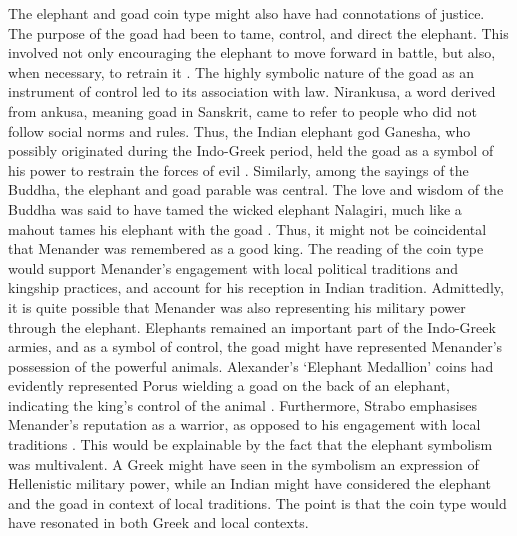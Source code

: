 \documentclass{ijsra}
\begin{document}
The elephant and goad coin type might also have had connotations of justice.
The purpose of the goad had been to tame, control, and direct the elephant. 
This involved not only encouraging the elephant to move forward in battle, but also, when necessary, to retrain it \parencite[66--67]{Trautmann2015}. 
The highly symbolic nature of the goad as an instrument of control led to its association with law. 
Nirankusa, a word derived from ankusa, meaning goad in Sanskrit, came to refer to people who did not follow social norms and rules. 
Thus, the Indian elephant god Ganesha, who possibly originated during the Indo-Greek period, 
held the goad as a symbol of his power to restrain the forces of evil \parencites[96]{Alter2004}[55]{Dhavalikar1991}.
Similarly, among the sayings of the Buddha, the elephant and goad parable was central. 
The love and wisdom of the Buddha was said to have tamed the wicked elephant Nalagiri, 
much like a mahout tames his elephant with the goad \parencite[96]{Dhammika2005}. 
Thus, it might not be coincidental that Menander was remembered as a good king. 
The reading of the coin type would support Menander’s engagement with local political traditions and kingship practices,
and account for his reception in Indian tradition. 
Admittedly, it is quite possible that Menander was also representing his military power through the elephant. 
Elephants remained an important part of the Indo-Greek armies, and as a symbol of control,
the goad might have represented Menander’s possession of the powerful animals.
Alexander’s ‘Elephant Medallion’ coins had evidently represented Porus wielding a goad on the back of an elephant,
indicating the king’s control of the animal \parencite[204--205]{Stewart1993}.
Furthermore, Strabo emphasises Menander’s reputation as a warrior, as opposed to his engagement with local traditions \parencite[644]{Mairs2014}.
This would be explainable by the fact that the elephant symbolism was multivalent. 
A Greek might have seen in the symbolism an expression of Hellenistic military power,
while an Indian might have considered the elephant and the goad in context of local traditions. 
The point is that the coin type would have resonated in both Greek and local contexts.
\end{document}

